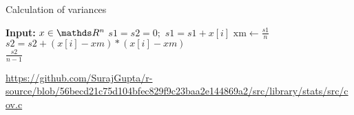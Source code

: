 \begin{vbframe}{Calculation of variances}
\begin{algorithm}[H]
  \begin{center}
  \caption{Calculation of variance in \texttt{R} (simplified)}
    \begin{algorithmic}[1]
    \State \textbf{Input:} $x \in \R^n$
    \State $s1 = s2 = 0;$
      \State $s1 = s1 + x[i]$
    \EndFor
    \State $\text{xm} \leftarrow \frac{s1}{n}$
      \State $s2 = s2 + (x[i] - xm) * (x[i] - xm)$
    \EndFor \\
    \Return $\frac{s2}{n - 1}$
    \end{algorithmic}
    \end{center}
\end{algorithm}

\vspace*{-0.5cm}

\begin{footnotesize}
\url{https://github.com/SurajGupta/r-source/blob/56becd21c75d104bfec829f9c23baa2e144869a2/src/library/stats/src/cov.c}
\end{footnotesize}

\end{vbframe}







\endlecture



